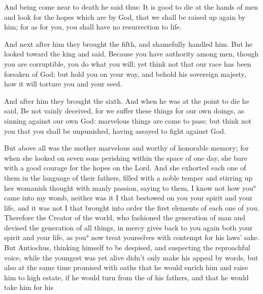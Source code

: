 {And being come near to death he said thus: It is good to die at the hands of men and look for the hopes which are
{} by God, that we shall be raised up again by him; for as for you, you shall have no resurrection to life.
\par }{\PP {}And next after him they brought the fifth, and shamefully handled him.
But he looked toward
 the king and said, Because you have authority among men, though you are
{} corruptible, you do what you will; yet think not that our race has been forsaken of God;
but hold you on your way, and behold his sovereign majesty, how it will torture you and your seed.
\par }{\PP {}And after him they brought the sixth. And when he was at the point to die he said, Be not vainly deceived, for we suffer these things for our own doings, as sinning against our own God: marvelous things are come to pass;
but think not you that you shall be unpunished, having assayed to fight against God.
\par }{\PP {}But above all was the mother marvelous and worthy of honorable memory; for when she looked on seven sons perishing within the space of one day, she bare
{} with a good courage for the hopes
{} on the Lord.
And she exhorted each one of them in the language of their fathers, filled with a noble temper and stirring up her womanish thought with manly passion, saying to them,
I know not how you° came into my womb, neither was it I that bestowed on you your
 spirit and your life, and it was not I that brought into order the first elements of each one of you.
Therefore the Creator of the world, who fashioned the
 generation of man and devised the
 generation of all things, in mercy gives back to you again both your
 spirit and your life, as you° now treat yourselves with contempt for his laws’ sake.
But Antiochus, thinking himself to be despised, and suspecting the reproachful voice, while the youngest was yet alive didn’t only make his appeal
{} by words, but also at the same time promised with oaths that he would enrich him and
 raise him to high estate, if he would turn from the
{} of his fathers, and that he would take him for his
}
